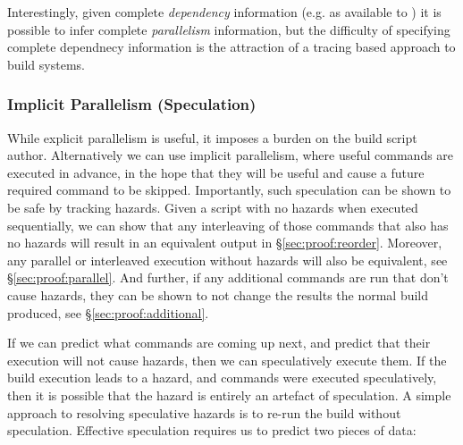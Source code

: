 Interestingly, given complete \emph{dependency} information (e.g. as available to \Make) it is possible to infer complete \emph{parallelism} information, but the difficulty of specifying complete dependnecy information is the attraction of a tracing based approach to build systems.

\subsubsection{Implicit Parallelism (Speculation)}
\label{sec:speculation}

While explicit parallelism is useful, it imposes a burden on the build script author. Alternatively we can use implicit parallelism, where useful commands are executed in advance, in the hope that they will be useful and cause a future required command to be skipped. Importantly, such speculation can be shown to be safe by tracking hazards. Given a script with no hazards when executed sequentially, we can show that any interleaving of those commands that also has no hazards will result in an equivalent output in \S\ref{sec:proof:reorder}. Moreover, any parallel or interleaved execution without hazards will also be equivalent, see \S\ref{sec:proof:parallel}. And further, if any additional commands are run that don't cause hazards, they can be shown to not change the results the normal build produced, see \S\ref{sec:proof:additional}.

If we can predict what commands are coming up next, and predict that their execution will not cause hazards, then we can speculatively execute them. If the build execution leads to a hazard, and commands were executed speculatively, then it is possible that the hazard is entirely an artefact of speculation. A simple approach to resolving speculative hazards is to re-run the build without speculation. Effective speculation requires us to predict two pieces of data:

